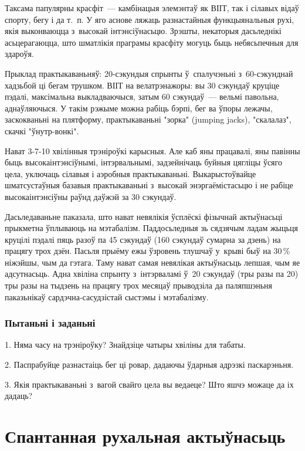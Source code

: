 Таксама папулярны красфіт~--- камбінацыя элемэнтаў як ВІІТ, так і сілавых відаў спорту, бегу і да т.~п. У яго аснове ляжаць разнастайныя функцыянальныя рухі, якія выконваюцца з~высокай інтэнсіўнасьцю. Зрэшты, некаторыя дасьледнікі асьцерагаюцца, што шматлікія праграмы красфіту могуць быць небясьпечныя для здароўя.

Прыклад практыкаваньняў: 20-сэкундыя спрынты ў~спалучэньні з~60-сэкунднай хадзьбой ці бегам трушком. ВІІТ на велатрэнажоры: вы 30 сэкундаў круціце пэдалі, максімальна выкладваючыся, затым 60 сэкундаў~--- вельмі павольна, аднаўляючыся. У такім рэжыме можна рабіць бэрпі, бег ва ўпоры лежачы, заскокваньні на плятформу, практыкаваньні "зорка" (jumping jacks), "скалалаз", скачкі "ўнутр-вонкі".

Нават 3-7-10 хвілінныя трэніроўкі карысныя. Але каб яны працавалі, яны павінны быць высокаінтэнсіўнымі, інтэрвальнымі, задзейнічаць буйныя цягліцы ўсяго цела, уключаць сілавыя і аэробныя практыкаваньні. Выкарыстоўвайце шматсустаўныя базавыя практыкаваньні з~высокай энэргаёмістасьцю і не рабіце высокаінтэнсіўны раўнд даўжэй за 30 сэкундаў. 

Дасьледаваньне паказала, што нават невялікія ўсплёскі фізычнай актыўнасьці прыкметна ўплываюць на мэтабалізм. Паддосьледныя зь сядзячым ладам жыцьця круцілі пэдалі пяць разоў па 45 сэкундаў (160 сэкундаў сумарна за дзень) на працягу трох дзён. Пасьля прыёму ежы ўзровень тлушчаў у~крыві быў на 30\,\% ніжэйшы, чым да гэтага. Таму нават самая невялікая актыўнасьць лепшая, чым яе адсутнасьць. Адна хвіліна спрынту з~інтэрваламі ў~20 сэкундаў (тры разы па 20) тры разы на тыдзень на працягу трох месяцаў прыводзіла да паляпшэньня паказьнікаў сардэчна-сасудзістай сыстэмы і мэтабалізму.

\subsubsection{Пытаньні і заданьні}

1. Няма часу на трэніроўку? Знайдзіце чатыры хвіліны для табаты.

2. Паспрабуйце разнастаіць бег ці ровар, дадаючы ўдарныя адрэзкі паскарэньня.

3. Якія практыкаваньні з~вагой свайго цела вы ведаеце? Што яшчэ можаце да іх дадаць?


\section{Спантанная рухальная актыўнасьць}

